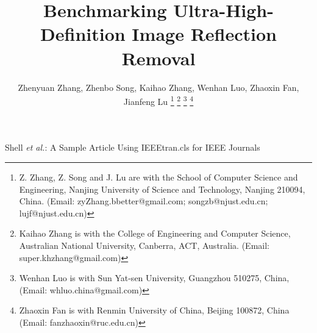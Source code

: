 \documentclass[10pt,journal]{IEEEtran}
\begin{document}
\title{Benchmarking Ultra-High-Definition Image Reflection Removal}

\author{Zhenyuan Zhang, Zhenbo Song, Kaihao Zhang, Wenhan Luo, Zhaoxin Fan, Jianfeng Lu
\thanks{Z. Zhang, Z. Song and J. Lu are with the School of Computer Science and Engineering, Nanjing University of Science and Technology, Nanjing 210094, China. (Email: zyZhang.bbetter@gmail.com; songzb@njust.edu.cn; lujf@njust.edu.cn)}
\thanks{Kaihao Zhang is with the College of Engineering and Computer Science, Australian National University, Canberra, ACT, Australia.  (Email: super.khzhang@gmail.com)}
\thanks{Wenhan Luo is with Sun Yat-sen University, Guangzhou 510275, China, 
(Email: whluo.china@gmail.com)}
\thanks{Zhaoxin Fan is with Renmin University of China, Beijing 100872, China
(Email: fanzhaoxin@ruc.edu.cn)}
}
%
{Shell \MakeLowercase{\textit{et al.}}: A Sample Article Using IEEEtran.cls for IEEE Journals}



\maketitle
\end{document}
